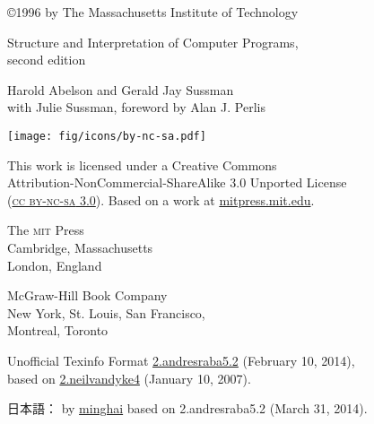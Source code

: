 \documentclass[oneside]{book}
\newcommand{\acronym}[1]{\textsc{\MakeLowercase{#1}}}
\begin{document}



\frontmatter



\pagebreak

\vspace*{\fill}
\thispagestyle{empty}

\begin{small}

\noindent
{\copyright}1996 by The Massachusetts Institute of Technology

\vspace{1.26em}
\noindent
Structure and Interpretation of Computer Programs,\\
second edition

\vspace{1.26em}
\noindent
Harold Abelson and Gerald Jay Sussman\\
with Julie Sussman, foreword by Alan J. Perlis

\vspace{1.6em}
\noindent
\texttt{[image: fig/icons/by-nc-sa.pdf]}

\vspace{0.4em}
\noindent
This work is licensed under a Creative Commons\\ 
Attribution-NonCommercial-ShareAlike 3.0 Unported License\\
(\href{http://creativecommons.org/licenses/by-nc-sa/3.0/}{\acronym{CC BY-NC-SA} 3.0}).
Based on a work at \href{http://mitpress.mit.edu/sicp/}{mitpress.mit.edu}.

\vspace{1.26em}
\noindent
The \acronym{MIT} Press\\
Cambridge, Massachusetts\\ 
London, England

\vspace{1.26em}
\noindent
McGraw-Hill Book Company\\
New York, St. Louis, San Francisco,\\ 
Montreal, Toronto

\vspace{1.26em}
\noindent
Unofficial Texinfo Format \href{http://sicpebook.wordpress.com}{2.andresraba5.2} (February 10, 2014),\\ 
based on \href{http://www.neilvandyke.org/sicp-texi/}{2.neilvandyke4} (January 10, 2007).

\vspace{1.26em}
\noindent
日本語： by \href{http://github.com/minghai/sicp-pdf/}{minghai} based on 2.andresraba5.2 (March 31, 2014).

\end{small}
\end{document}
